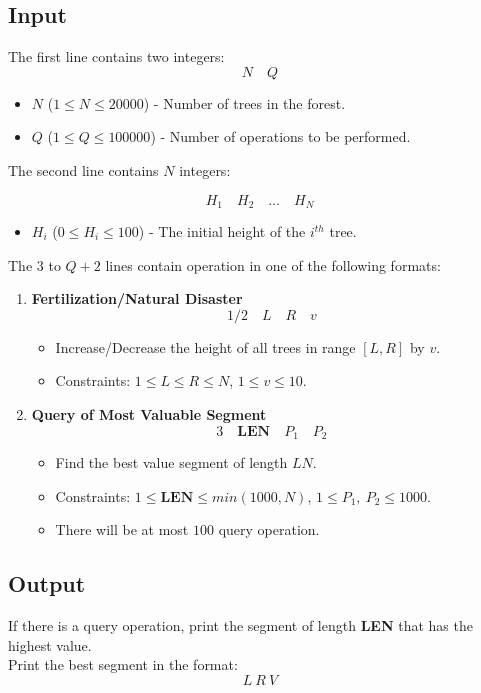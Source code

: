 \documentclass[12pt,a4paper]{article}
\begin{document}
\subsection*{\fontsize{16}{12}Input}
The first line contains two integers:
\[
N \quad Q
\]

\begin{itemize}
    \item \( N \) (\( 1 \leq N \leq 20000 \)) - Number of trees in the forest.
    \item \( Q \) (\( 1 \leq Q \leq 100000 \)) - Number of operations to be performed.
\end{itemize}
\newpage\noindent
The second line contains \(N\) integers:

\[
H_1 \quad H_2 \quad \dots \quad H_N
\]

\begin{itemize}
    \item \( H_i \) (\( 0 \leq H_i \leq 100 \)) - The initial height of the \( i^{th} \) tree.
\end{itemize}
\noindent
The $3$ to $Q+2$ lines contain operation in one of the following formats:

\begin{enumerate}
    \item \textbf{Fertilization/Natural Disaster}
    \[
    1/2 \quad L \quad R \quad v
    \]
    \begin{itemize}
        \item Increase/Decrease the height of all trees in range \( [L, R] \) by \( v \).
        \item Constraints: \( 1 \leq L \leq R \leq N \), \( 1 \leq v \leq 10 \).
    \end{itemize}
    
    \item \textbf{Query of Most Valuable Segment}
    \[
    3 \quad \textbf{LEN} \quad P_1 \quad P_2
    \]
    \begin{itemize}
        \item Find the best value segment of length $LN$.
        \item Constraints: \( 1 \leq \textbf{LEN} \leq min(1000, N) \), \( 1 \leq P_1,\ P_2 \leq 1000 \).
        \item There will be at most $100$ query operation.
    \end{itemize}
\end{enumerate}

\subsection*{\fontsize{16}{12}Output}
If there is a query operation, print the segment of length \textbf{LEN} that has the highest value.\\
\noindent
Print the best segment in the format:
\[
L\ R\ V
\]
\end{document}
